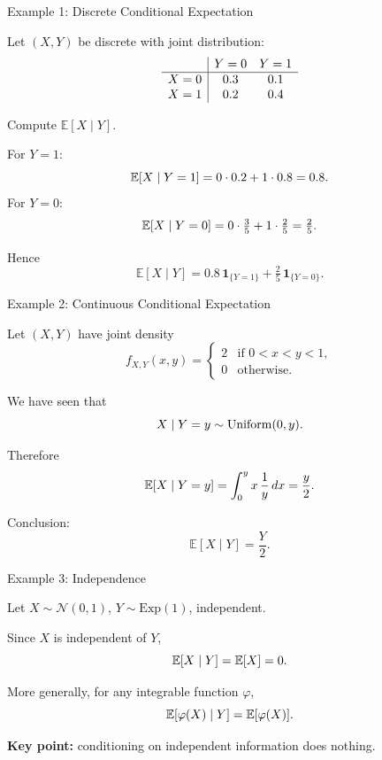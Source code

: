 \documentclass[aspectratio=169]{beamer}
\begin{document}

\begin{frame}{Example 1: Discrete Conditional Expectation}

Let \((X,Y)\) be discrete with joint distribution:
\[
\begin{array}{c|cc}
 & Y=0 & Y=1 \\ \hline
X=0 & 0.3 & 0.1 \\
X=1 & 0.2 & 0.4
\end{array}
\vspace{-5mm}
\]\pause

\medskip

Compute \(\mathbb{E}[X\mid Y]\).
\pause
\medskip

For \(Y=1\):
\[
\mathbb{E}[X\mid Y=1]
=
0\cdot 0.2 + 1\cdot 0.8 = 0.8.
\vspace{-5mm}
\]
\pause
For \(Y=0\):
\[
\mathbb{E}[X\mid Y=0]
=
0\cdot \tfrac{3}{5} + 1\cdot \tfrac{2}{5} = \tfrac{2}{5}.
\vspace{-5mm}
\]
\pause

Hence
\[
\mathbb{E}[X\mid Y]
=
0.8\,\mathbf{1}_{\{Y=1\}}
+
\tfrac{2}{5}\,\mathbf{1}_{\{Y=0\}}.
\]

\end{frame}

\begin{frame}{Example 2: Continuous Conditional Expectation}

Let \((X,Y)\) have joint density
\[
f_{X,Y}(x,y)=
\begin{cases}
2 & \text{if } 0<x<y<1,\\
0 & \text{otherwise.}
\end{cases}
\]\pause

\medskip

We have seen that
\[
X\mid Y=y \sim \mathrm{Uniform}(0,y).
\vspace{-5mm}
\]\pause

\medskip

Therefore
\[
\mathbb{E}[X\mid Y=y]
=
\int_0^y x\,\frac{1}{y}\,dx
=
\frac{y}{2}.
\vspace{-5mm}
\]\pause

\medskip

Conclusion:
\[
\mathbb{E}[X\mid Y]=\frac{Y}{2}.
\]

\end{frame}

\begin{frame}{Example 3: Independence}

Let \(X\sim\mathcal{N}(0,1)\),
\(Y\sim\mathrm{Exp}(1)\),
independent.
\pause
\medskip

Since \(X\) is independent of \(Y\),
\[
\mathbb{E}[X\mid Y]=\mathbb{E}[X]=0.
\vspace{-5mm}
\]
\pause

More generally, for any integrable function \(\varphi\),
\[
\mathbb{E}[\varphi(X)\mid Y]
=
\mathbb{E}[\varphi(X)].
\vspace{-5mm}
\]\pause

\medskip

\textbf{Key point:}
conditioning on independent information does nothing.

\end{frame}
\end{document}
